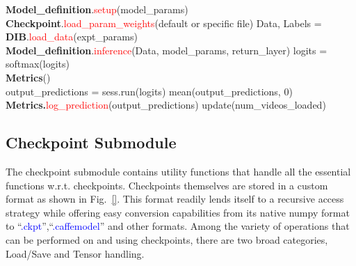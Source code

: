 \documentclass{llncs}
\begin{document}
\begin{algorithmic}[H]
\State \textbf{Model\_definition}.\textcolor{red}{setup}(model\_params)
\State \textbf{Checkpoint}.\textcolor{red}{load\_param\_weights}(default or specific file)
\State Data, Labels = \textbf{DIB}.\textcolor{red}{load\_data}(expt\_params)
\\
\State \textbf{Model\_definition}.\textcolor{red}{inference}(Data, model\_params, return\_layer)
\State logits = softmax(logits)
\EndIf
\EndFor
\\
\State \textbf{Metrics}()
\\
\State output\_predictions = sess.run(logits)
\State mean(output\_predictions, 0)
\EndIf
\State \textbf{Metrics.}\textcolor{red}{log\_prediction}(output\_predictions)
\State update(num\_videos\_loaded)
\EndWhile
\EndProcedure
\end{algorithmic}


\subsection{Checkpoint Submodule}
\label{sec:checkpoint}
The checkpoint submodule contains utility functions that handle all the essential functions w.r.t. checkpoints.
Checkpoints themselves are stored in a custom format as shown in Fig.~\ref{}.
This format readily lends itself to a recursive access strategy while offering easy conversion capabilities from its native numpy format to ``\textcolor{blue}{.ckpt}'',``\textcolor{blue}{.caffemodel}'' and other formats.
Among the variety of operations that can be performed on and using checkpoints, there are two broad categories, Load/Save and Tensor handling.
\end{document}
